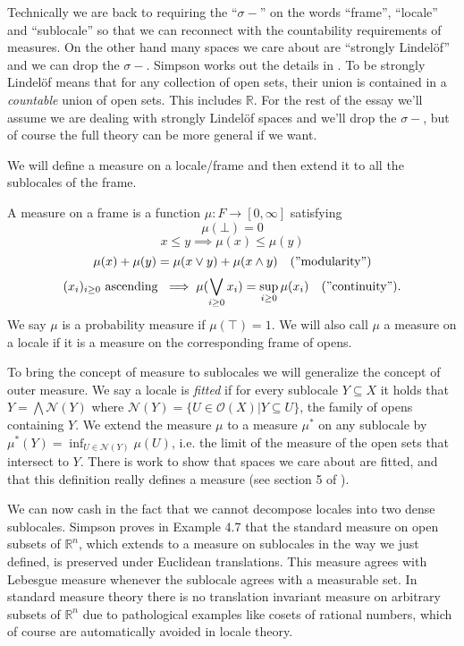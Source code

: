 \documentclass[14pt]{extarticle}
\renewcommand{\o}{\ensuremath{\mathcal{O}}}
\newcommand{\sig}{\ensuremath{\sigma-}}
\begin{document}
Technically we are back to requiring the ``\sig'' on the words ``frame'', ``locale'' and ``sublocale'' so that we can reconnect with the countability requirements of measures. On the other hand many spaces we care about are ``strongly Lindelöf'' and we can drop the \sig. Simpson works out the details in \cite{simpson}. To be strongly Lindelöf means that for any collection of open sets, their union is contained in a \emph{countable} union of open sets. This includes $\mathbb{R}$. For the rest of the essay we'll assume we are dealing with strongly Lindelöf spaces and we'll drop the \sig, but of course the full theory can be more general if we want.

We will define a measure on a locale/frame and then extend it to all the sublocales of the frame.

A measure on a frame is a function $\mu:F\to [0,\infty]$ satisfying
$$\mu(\bot)=0$$
$$x\leq y\implies \mu(x)\leq\mu(y)$$
$$\mu(x)+\mu(y)=\mu(x\vee y)+\mu(x\wedge y)\quad\mathrm{("modularity")}$$
$$(x_i)_{i\geq 0}\mathrm{\ ascending\ }\implies \mu(\bigvee_{i\geq 0}x_i)=\sup_{i\geq 0}\mu(x_i)\quad\mathrm{("continuity")}.$$
We say $\mu$ is a probability measure if $\mu(\top)=1$. We will also call $\mu$ a measure on a locale if it is a measure on the corresponding frame of opens.

To bring the concept of measure to sublocales we will generalize the concept of outer measure. We say a locale is \emph{fitted} if for every sublocale $Y\subseteq X$ it holds that $Y=\bigwedge\mathcal{N}(Y)$ where $\mathcal{N}(Y)=\{U\in\o(X)|Y\subseteq U\}$, the family of opens containing $Y$. We extend the measure $\mu$ to a measure $\mu^*$ on any sublocale by $\mu^*(Y)=\inf_{U\in\mathcal{N}(Y)}\mu(U)$, i.e. the limit of the measure of the open sets that intersect to $Y$. There is work to show that spaces we care about are fitted, and that this definition really defines a measure (see section 5 of \cite{simpson}).

We can now cash in the fact that we cannot decompose locales into two dense sublocales. Simpson \cite{simpson} proves in Example 4.7 that the standard measure on open subsets of $\mathbb{R}^n$, which extends to a measure on sublocales in the way we just defined, is preserved under Euclidean translations. This measure agrees with Lebesgue measure whenever the sublocale agrees with a measurable set. In standard measure theory there is no translation invariant measure on arbitrary subsets of $\mathbb{R}^n$ due to pathological examples like cosets of rational numbers, which of course are automatically avoided in locale theory. 
\end{document}
